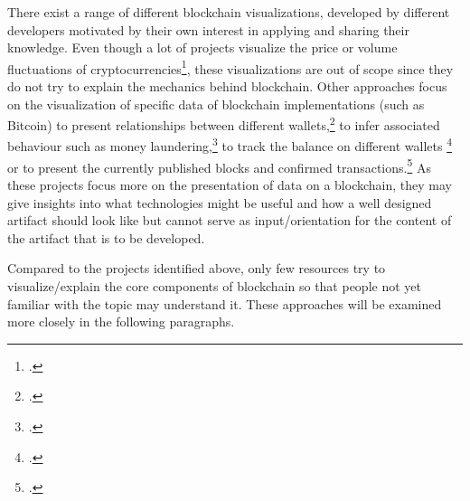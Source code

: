 There exist a range of different blockchain visualizations, developed by different developers motivated by their own interest in applying and sharing their knowledge. Even though a lot of projects visualize the price or volume fluctuations of cryptocurrencies\footcites[Cf.][]{SapekCryptowatchliveBitcoin2014}[cf.][]{CryptoMapsCryptocurrencyMarket}, these visualizations are out of scope since they do not try to explain the mechanics behind blockchain. Other approaches focus on the visualization of specific data of blockchain implementations (such as Bitcoin) to present relationships between different wallets,\footcites[Cf.][]{Reidanalysisanonymitybitcoin2013}[cf.][]{BaumannExploringBitcoinnetwork2014}[cf.][]{Interaqt2016}[cf.][]{McGinnVisualizingDynamicBitcoin2016}[cf.][]{McGinnOpenDataBlockchain2018} to infer associated behaviour such as money laundering,\footcites[Cf.][]{Meiklejohnfistfulbitcoinscharacterizing2013}[cf.][]{EllipticEnterprisesLimitedEllipticBitcoinBig} to track the balance on different wallets \footcites[Cf.][]{EtherScanEthereumBlock}[cf.][]{BlcokchainLuxembourgS.A.R.L.BlockchaininfoBitcoin} or to present the currently published blocks and confirmed transactions.\footcites[Cf.][]{BattistaBitconeviewvisualizationflows2015}[cf.][]{BitcoinCityinfoRoad}[cf.][]{Bitbonkers2016}[cf.][]{BlockSeer2015}[cf.][]{DailyBlockchainBlockchain2013}[cf][]{YeowBitcoinNodesGlobal2018}[cf.][]{LaumeisterBitListenBitcoinTransaction2015}[cf.][]{MillerBitcoinVisualizer2015}[cf.][]{VisualizingBitcoinTransactions2015}[cf.][]{Blockchain3DExplorer2017} As these projects focus more on the presentation of data on a blockchain, they may give insights into what technologies might be useful and how a well designed artifact should look like but cannot serve as input/orientation for the content of the artifact that is to be developed. 

Compared to the projects identified above, only few resources try to visualize/explain the core components of blockchain so that people not yet familiar with the topic may understand it. These approaches will be examined more closely in the following paragraphs.  

